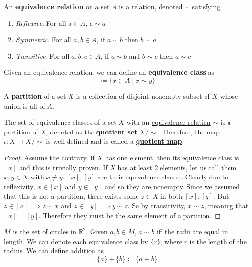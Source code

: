   \begin{definition}
		\label{def:equivalence_relation}
    An \textbf{equivalence relation} on a set $A$ is a relation, denoted $\sim$ satisfying 
    \begin{enumerate}
      \item \textit{Reflexive}. For all $a \in A$, $a \sim a$
      \item \textit{Symmetric}. For all $a,b \in A$, if $a \sim b$ then $b \sim a$
      \item \textit{Transitive}. For all $a,b,c \in A$, if $a \sim b$ and $b \sim c$ then $a \sim c$
    \end{enumerate}
    Given an equivalence relation, we can define an \textbf{equivalence class} as 
    \begin{equation}
      [y] \coloneqq \{ x \in A \mid x \sim y \}
    \end{equation}
  \end{definition}

  \begin{definition}[Partition]
    \label{def:partition-2}
    A \textbf{partition} of a set $X$ is a collection of disjoint nonempty subset of $X$ whose union is all of $A$. 
  \end{definition} 

  \begin{definition}
    \label{def:partition}
    The set of equivalence classes of a set $X$ with an \hyperref[def:equivalence_relation]{equivalence relation} $\sim$ is a partition of $X$, denoted as the \textbf{quotient set} $X/\sim$. Therefore, the map $\iota: X \rightarrow X/\sim$ is well-defined and is called a \textbf{\hyperref[pst-def:quotient-map]{quotient map}}. 
  \end{definition} 
  \begin{proof}
    Assume the contrary. If $X$ has one element, then its equivalence class is $[x]$ and this is trivially proven. If $X$ has at least 2 elements, let us call them $x, y \in X$ with $x \neq y$. $[x], [y]$ are their equivalence classes. Clearly due to reflexivity, $x \in [x]$ and $y \in [y]$ and so they are nonempty. Since we assumed that this is not a partition, there exists some $z \in X$ in both $[x], [y]$. But $z \in [x] \implies z \sim x$ and $z \in [y] \implies y \sim z$. So by transitivity, $x \sim z$, meaning that $[x] = [y]$. Therefore they must be the same element of a partition. 
  \end{proof}

  \begin{example}[Circles]
    \label{ex:circles}
    $M$ is the set of circles in $\mathbb{R}^{2}$. Given $a, b \in M$, $a \sim b$ iff the radii are equal in length. We can denote each equivalence class by $\{ r \}$, where $r$ is the length of the radius. We can define addition as 
    \begin{equation}
      \{ a \} + \{ b \} \coloneqq \{ a + b\}
    \end{equation}
  \end{example}

